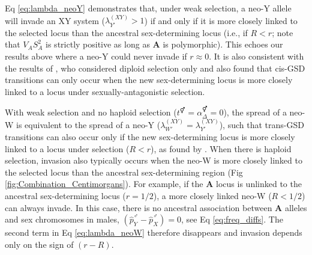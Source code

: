 \documentclass[10pt,letterpaper]{article}
\providecommand{\DIFaddtex}[1]{{\protect\color{blue}\uwave{#1}}} %
\providecommand{\DIFdeltex}[1]{{\protect\color{red}\sout{#1}}}                      %
\providecommand{\DIFaddbegin}{} %
\providecommand{\DIFaddend}{} %
\providecommand{\DIFdelbegin}{} %
\providecommand{\DIFdelend}{} %
\providecommand{\DIFadd}[1]{\texorpdfstring{\DIFaddtex{#1}}{#1}} %
\providecommand{\DIFdel}[1]{\texorpdfstring{\DIFdeltex{#1}}{}} %
\newcommand{\DIFscaledelfig}{0.5}
\newlength{\DIFdelgraphicswidth} %
\newlength{\DIFdelgraphicsheight} %
\newcommand{\DIFaddincludegraphics}[2][]{{\color{blue}\fbox{\DIFOincludegraphics[#1]{#2}}}} %
\newcommand{\DIFdelincludegraphics}[2][]{%
\sbox{\DIFdelgraphicsbox}{\DIFOincludegraphics[#1]{#2}}%
\settoboxwidth{\DIFdelgraphicswidth}{\DIFdelgraphicsbox} %
\settoboxtotalheight{\DIFdelgraphicsheight}{\DIFdelgraphicsbox} %
\scalebox{\DIFscaledelfig}{%
\parbox[b]{\DIFdelgraphicswidth}{\usebox{\DIFdelgraphicsbox}\\[-\baselineskip] \rule{\DIFdelgraphicswidth}{0em}}\llap{\resizebox{\DIFdelgraphicswidth}{\DIFdelgraphicsheight}{%
\setlength{\unitlength}{\DIFdelgraphicswidth}%
\begin{picture}(1,1)%
\thicklines\linethickness{2pt} %
{\color[rgb]{1,0,0}\put(0,0){\framebox(1,1){}}}%
{\color[rgb]{1,0,0}\put(0,0){\line( 1,1){1}}}%
{\color[rgb]{1,0,0}\put(0,1){\line(1,-1){1}}}%
\end{picture}%
}\hspace*{3pt}}} %
} %
\DeclareRobustCommand{\DIFaddbegin}{\DIFOaddbegin \let\includegraphics\DIFaddincludegraphics} %
\DeclareRobustCommand{\DIFaddend}{\DIFOaddend \let\includegraphics\DIFOincludegraphics} %
\DeclareRobustCommand{\DIFdelbegin}{\DIFOdelbegin \let\includegraphics\DIFdelincludegraphics} %
\DeclareRobustCommand{\DIFdelend}{\DIFOaddend \let\includegraphics\DIFOincludegraphics} %
\begin{document}
Eq \eqref{eq:lambda_neoY} demonstrates that, under weak selection, a neo-Y allele will invade an XY system ($\lambda_{Y'}^{(XY)}>1$) if and only if it is more closely linked to the selected locus than the ancestral sex-determining locus (i.e., if $R<r$; note that $V_{A}S_{A}^2$ is strictly positive as long as $\mathbf{A}$ is polymorphic). 
This echoes our results above where a neo-Y could never invade if $r\approx0$. 
It is also consistent with the results of \cite{vanDoorn:2007eu}, who considered diploid selection only and also found that cis-GSD transitions can only occur when the new sex-determining locus is more closely linked to a locus under sexually-antagonistic selection. 

With weak selection and no haploid selection (\DIFdelbegin \DIFdel{$t^\Hermaphrodite=\alpha^\Hermaphrodite_{\Delta}=0$}\DIFdelend \DIFaddbegin \DIFadd{$t^\circ=\alpha^\circ_{\Delta}=0$}\DIFaddend ), the spread of a neo-W is equivalent to the spread of a neo-Y ($\lambda_{W'}^{(XY)}=\lambda_{Y'}^{(XY)}$), such that trans-GSD transitions can also occur only if the new sex-determining locus is more closely linked to a locus under selection ($R<r$), as found by \cite{vanDoorn:2010hu}. 
When there is haploid selection, invasion also typically occurs when the neo-W is more closely linked to the selected locus than the ancestral sex-determining region (Fig \ref{fig:Combination_Centimorgans}).
For example, if the $\mathbf{A}$ locus is unlinked to the ancestral sex-determining locus ($r=1/2$), a more closely linked neo-W ($R<1/2$) can always invade.
In this case, there is no ancestral association between $\mathbf{A}$ alleles and sex chromosomes in males, $\left( \hat{p}^\male_Y-\hat{p}^\male_X \right)=0$, see Eq \eqref{eq:freq_diffs}. 
The second term in Eq \eqref{eq:lambda_neoW} therefore disappears and invasion depends only on the sign of $(r-R)$.%
\end{document}
